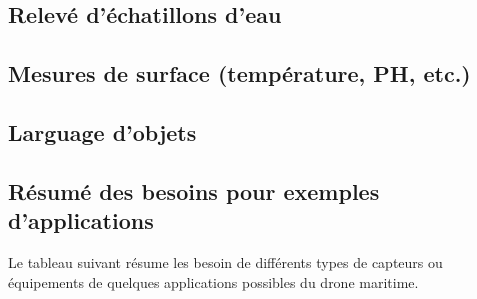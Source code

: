 \subsection{Relevé d'échatillons d'eau}

\subsection{Mesures de surface (température, PH, etc.)}

\subsection{Larguage d'objets}

\subsection{Résumé des besoins pour exemples d'applications}
Le tableau suivant résume les besoin de différents types de capteurs ou équipements de quelques applications possibles du drone maritime.

